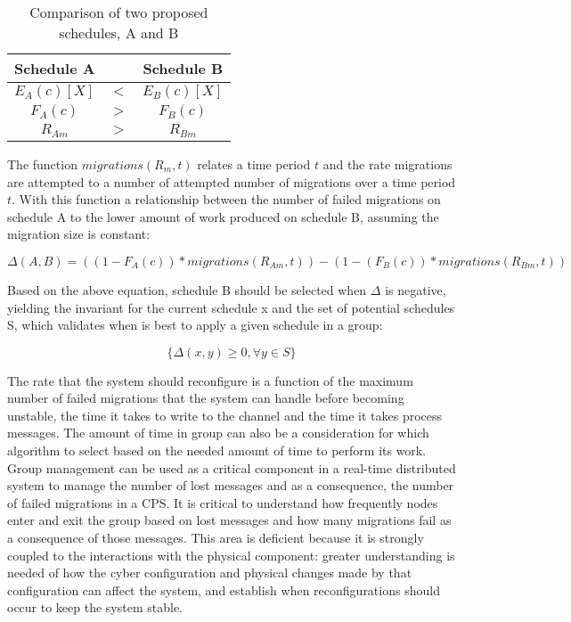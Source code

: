 \begin{table}
\caption{Comparison of two proposed schedules, A and B}
\label{tab:SCHED-COMPARE}
\centering
\begin{tabular}{ c  c  c }
Schedule A & & Schedule B \\ \hline
$E_{A}(c)[X]$ & $<$ & $E_{B}(c)[X]$ \\
$F_{A}(c)$ & $>$ & $F_{B}(c)$ \\ 
$R_{Am}$ & $>$ & $R_{Bm}$ \\ 
\end{tabular}
\end{table}

The function $migrations(R_{m},t)$ relates a time period $t$ and the rate migrations are attempted to a number of attempted number of migrations over a time period $t$.
With this function a relationship between the number of failed migrations on schedule A to the lower amount of work produced on schedule B, assuming the migration size is constant:

\begin{equation}
\Delta(A,B) = ((1-F_{A}(c)) * migrations(R_{Am},t)) - (1-(F_{B}(c)) * migrations(R_{Bm},t))
\end{equation}

Based on the above equation, schedule B should be selected when $\Delta$ is negative, yielding the invariant for the current schedule x and the set of potential schedules S, which validates when is best to apply
a given schedule in a group:

\begin{equation}
\{ \Delta(x,y) \geq 0, \forall y \in S \}
\end{equation}

The rate that the system should reconfigure is a function of the maximum number of failed migrations that the system can handle before becoming unstable, the time it takes to write to the channel and the time it takes process messages.
The amount of time in group can also be a consideration for which algorithm to select based on the needed amount of time to perform its work.
Group management can be used as a critical component in a real-time distributed system to manage the number of lost messages and as a consequence, the number of failed migrations in a CPS.
It is critical to understand how frequently nodes enter and exit the group based on lost messages and how many migrations fail as a consequence of those messages.
This area is deficient because it is strongly coupled to the interactions with the physical component: greater understanding is needed of how the cyber configuration and physical changes made by that configuration can affect the system, and establish when reconfigurations should occur to keep the system stable.

